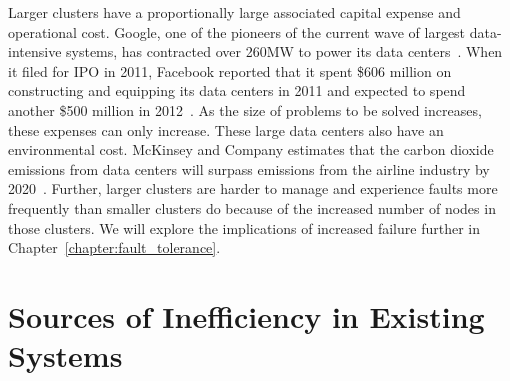 Larger clusters have a proportionally large associated capital expense and
operational cost. Google, one of the pioneers of the current wave of largest
data-intensive systems, has contracted over 260MW to power its data
centers~\cite{google-dc-power-blog}. When it filed for IPO in 2011, Facebook
reported that it spent \$606 million on constructing and equipping its data
centers in 2011 and expected to spend another \$500 million in
2012~\cite{facebook-ipo}. As the size of problems to be solved increases, these
expenses can only increase. These large data centers also have an environmental
cost. McKinsey and Company estimates that the carbon dioxide emissions from
data centers will surpass emissions from the airline industry by
2020~\cite{mckinsey-co2-study}.  Further, larger clusters are harder to manage
and experience faults more frequently than smaller clusters do because of the
increased number of nodes in those clusters. We will explore the implications
of increased failure further in Chapter~\ref{chapter:fault_tolerance}.

\section{Sources of Inefficiency in Existing Systems}
